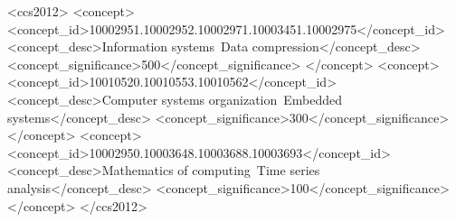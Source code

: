 \documentclass[acmlarge]{acmart}
\begin{document}

\begin{CCSXML}
<ccs2012>
 <concept>
  <concept_id>10002951.10002952.10002971.10003451.10002975</concept_id>
  <concept_desc>Information systems~Data compression</concept_desc>
  <concept_significance>500</concept_significance>
 </concept>
 <concept>
  <concept_id>10010520.10010553.10010562</concept_id>
  <concept_desc>Computer systems organization~Embedded systems</concept_desc>
  <concept_significance>300</concept_significance>
 </concept>
 <concept>
  <concept_id>10002950.10003648.10003688.10003693</concept_id>
  <concept_desc>Mathematics of computing~Time series analysis</concept_desc>
  <concept_significance>100</concept_significance>
 </concept>
</ccs2012>
\end{CCSXML}







\maketitle


\end{document}
